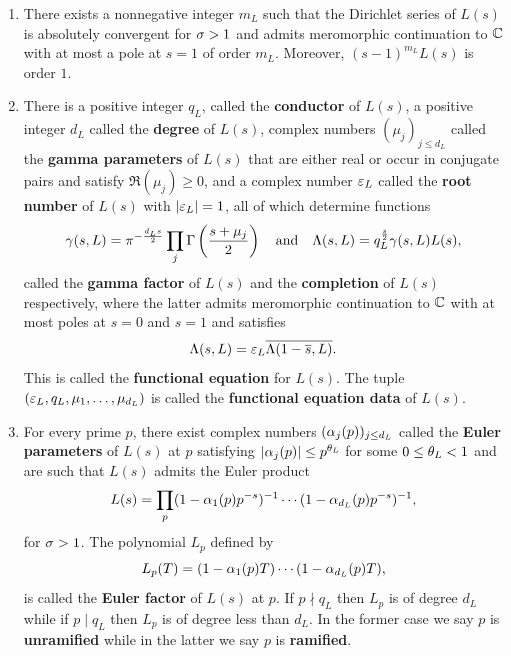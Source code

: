     \begin{enumerate}[align=left]
      \item[\textbf{Analyticity:}] There exists a nonnegative integer \(m_{L}\) such that the Dirichlet series of \(L(s)\) is absolutely convergent for \(\sigma > 1\) and admits meromorphic continuation to \(\mathbb{C}\) with at most a pole at \(s = 1\) of order \(m_{L}\). Moreover, \((s-1)^{m_{L}}L(s)\) is order \(1\).
      \item[\textbf{Functional Equation:}] There is a positive integer \(q_{L}\), called the \textbf{conductor} of \(L(s)\), a positive integer \(d_{L}\) called the \textbf{degree} of \(L(s)\), complex numbers \((\mu_{j})_{j \le d_{L}}\) called the \textbf{gamma parameters} of \(L(s)\) that are either real or occur in conjugate pairs and satisfy \(\Re(\mu_{j}) \ge 0\), and a complex number \(\varepsilon_{L}\) called the \textbf{root number} of \(L(s)\) with \(|\varepsilon_{L}| = 1\), all of which determine functions
      \[
        \gamma(s,L) = \pi^{-\frac{d_{L}s}{2}}\prod_{j}\Gamma\left(\frac{s+\mu_{j}}{2}\right) \quad \text{and} \quad \Lambda(s,L) = q_{L}^{\frac{s}{2}}\gamma(s,L)L(s),
      \]
      called the \textbf{gamma factor} of \(L(s)\) and the \textbf{completion} of \(L(s)\) respectively, where the latter admits meromorphic continuation to \(\mathbb{C}\) with at most poles at \(s = 0\) and \(s = 1\) and satisfies
      \[
        \Lambda(s,L) = \varepsilon_{L}\overline{\Lambda(1-\overline{s},L)}.
      \]
      This is called the \textbf{functional equation} for \(L(s)\). The tuple \((\varepsilon_{L},q_{L},\mu_{1},\ldots,\mu_{d_{L}})\) is called the \textbf{functional equation data} of \(L(s)\).
      \item[\textbf{Euler product:}] For every prime \(p\), there exist complex numbers \((\alpha_{j}(p))_{j \le d_{L}}\) called the \textbf{Euler parameters} of \(L(s)\) at \(p\) satisfying \(|\alpha_{j}(p)| \le p^{\theta_{L}}\) for some \(0 \le \theta_{L} < 1\) and are such that \(L(s)\) admits the Euler product
      \[
        L(s) = \prod_{p}(1-\alpha_{1}(p)p^{-s})^{-1} \cdots (1-\alpha_{d_{L}}(p)p^{-s})^{-1},
      \]
      for \(\sigma > 1\). The polynomial \(L_{p}\) defined by
      \[
        L_{p}(T) = (1-\alpha_{1}(p)T) \cdots (1-\alpha_{d_{L}}(p)T),
      \]
      is called the \textbf{Euler factor} of \(L(s)\) at \(p\). If \(p \nmid q_{L}\) then \(L_{p}\) is of degree \(d_{L}\) while if \(p \mid q_{L}\) then \(L_{p}\) is of degree less than \(d_{L}\). In the former case we say \(p\) is \textbf{unramified} while in the latter we say \(p\) is \textbf{ramified}.
    \end{enumerate}

